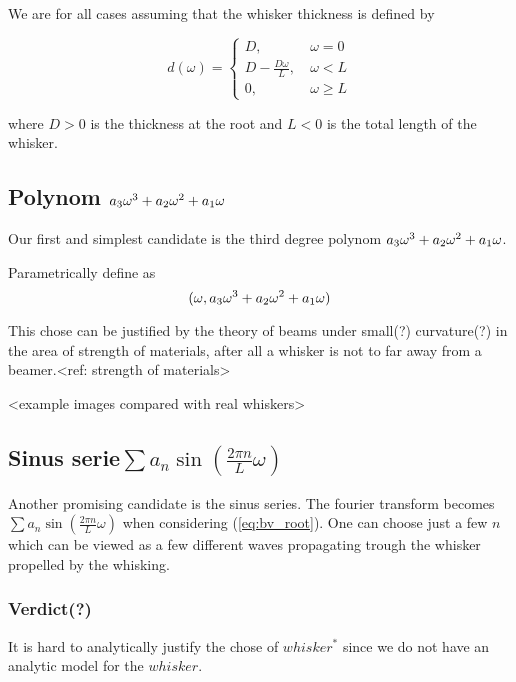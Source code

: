 We are for all cases assuming that the whisker thickness is defined by

\begin{equation}
    d(\omega) = \begin{cases}
        D,~& \omega=0\\
        D-\frac{D\omega}{L},~& \omega<L\\
        0,~& \omega\ge L
    \end{cases}
\end{equation}

where $D>0$ is the thickness at the root and $L<0$ is the total length of the
whisker.

\subsection{Polynom $a_3\omega^3+a_2\omega^2+a_1\omega$}

    Our first and simplest candidate is the third degree polynom $a_3\omega^3+a_2\omega^2+a_1\omega$.

    Parametrically define as
    \begin{equation}
        (\omega,a_3\omega^3+a_2\omega^2+a_1\omega)
    \end{equation}

    This chose can be justified by the theory of beams under small(?) curvature(?) in the area of 
    strength of materials, after all a whisker is not to far away from a
    beamer.<ref: strength of materials>

    <example images compared with real whiskers>

\subsection{Sinus serie$\sum{a_n\sin (\frac{2\pi n}{L}\omega)}$}
    Another promising candidate is the sinus series.
    The fourier transform becomes $\sum{a_n\sin (\frac{2\pi n}{L}\omega)}$ when
    considering (\ref{eq:bv_root}). One can choose just a few $n$ which can be
    viewed as a few different waves propagating trough the whisker propelled by
    the whisking. 

\subsubsection{Verdict(?)}
    It is hard to analytically justify the chose of $whisker^*$ since we do not
    have an analytic model for the $whisker$.




